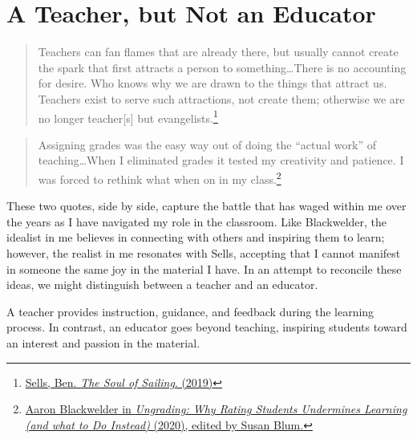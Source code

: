 \documentclass[
  letterpaper,
  DIV=11,
  numbers=noendperiod]{scrreprt}
\begin{document}

\chapter{A Teacher, but Not an
Educator}\label{a-teacher-but-not-an-educator}

\begin{quote}
Teachers can fan flames that are already there, but usually cannot
create the spark that first attracts a person to something\ldots There
is no accounting for desire. Who knows why we are drawn to the things
that attract us. Teachers exist to serve such attractions, not create
them; otherwise we are no longer teacher{[}s{]} but
evangelists.\footnote{\href{https://www.amazon.com/Soul-Sailing-Benjamin-Sells/dp/1710340894}{Sells,
  Ben. \emph{The Soul of Sailing}. (2019)}}
\end{quote}

\begin{quote}
Assigning grades was the easy way out of doing the ``actual work'' of
teaching\ldots When I eliminated grades it tested my creativity and
patience. I was forced to rethink what when on in my class.\footnote{\href{https://wvupressonline.com/ungrading}{Aaron
  Blackwelder in \emph{Ungrading: Why Rating Students Undermines
  Learning (and what to Do Instead)} (2020), edited by Susan Blum.}}
\end{quote}

These two quotes, side by side, capture the battle that has waged within
me over the years as I have navigated my role in the classroom. Like
Blackwelder, the idealist in me believes in connecting with others and
inspiring them to learn; however, the realist in me resonates with
Sells, accepting that I cannot manifest in someone the same joy in the
material I have. In an attempt to reconcile these ideas, we might
distinguish between a teacher and an educator.

\begin{tcolorbox}[enhanced jigsaw, coltitle=black, colframe=quarto-callout-tip-color-frame, opacityback=0, rightrule=.15mm, bottomrule=.15mm, leftrule=.75mm, bottomtitle=1mm, colbacktitle=quarto-callout-tip-color!10!white, breakable, titlerule=0mm, title=\textcolor{quarto-callout-tip-color}{\faLightbulb}\hspace{0.5em}{Educator vs.~Teacher}, left=2mm, toptitle=1mm, toprule=.15mm, colback=white, arc=.35mm, opacitybacktitle=0.6]

A teacher provides instruction, guidance, and feedback during the
learning process. In contrast, an educator goes beyond teaching,
inspiring students toward an interest and passion in the material.

\end{tcolorbox}
\end{document}
